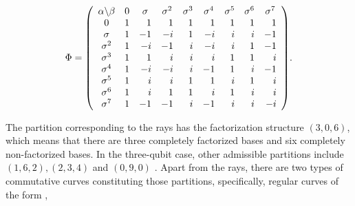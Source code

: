 \documentclass[quantumrep,article,submit,pdftex,moreauthors]{Definitions/mdpi}
\begin{document}
\begin{equation}
  \Phi
  =\left( 
  \begin{array}{ccccccccc}
    \alpha \backslash \beta & 0 & \sigma & \sigma ^{2} & \sigma ^{3} & \sigma
    ^{4} & \sigma ^{5} & \sigma ^{6} & \sigma ^{7} \\ 
    0 & \multicolumn{1}{r}{1} & \multicolumn{1}{r}{1} & \multicolumn{1}{r}{1} & 
    \multicolumn{1}{r}{1} & \multicolumn{1}{r}{1} & \multicolumn{1}{r}{1} & 
    \multicolumn{1}{r}{1} & \multicolumn{1}{r}{1} \\ 
    \sigma & \multicolumn{1}{r}{1} & \multicolumn{1}{r}{-1} & \multicolumn{1}{r}{
    -i} & \multicolumn{1}{r}{1} & \multicolumn{1}{r}{-i} & \multicolumn{1}{r}{i}
    & \multicolumn{1}{r}{i} & \multicolumn{1}{r}{-1} \\ 
    \sigma ^{2} & \multicolumn{1}{r}{1} & \multicolumn{1}{r}{-i} & 
    \multicolumn{1}{r}{-1} & \multicolumn{1}{r}{i} & \multicolumn{1}{r}{-i} & 
    \multicolumn{1}{r}{i} & \multicolumn{1}{r}{1} & \multicolumn{1}{r}{-1} \\ 
    \sigma ^{3} & \multicolumn{1}{r}{1} & \multicolumn{1}{r}{1} & 
    \multicolumn{1}{r}{i} & \multicolumn{1}{r}{i} & \multicolumn{1}{r}{i} & 
    \multicolumn{1}{r}{1} & \multicolumn{1}{r}{1} & \multicolumn{1}{r}{i} \\ 
    \sigma ^{4} & \multicolumn{1}{r}{1} & \multicolumn{1}{r}{-i} & 
    \multicolumn{1}{r}{-i} & \multicolumn{1}{r}{i} & \multicolumn{1}{r}{-1} & 
    \multicolumn{1}{r}{1} & \multicolumn{1}{r}{i} & \multicolumn{1}{r}{-1} \\ 
    \sigma ^{5} & \multicolumn{1}{r}{1} & \multicolumn{1}{r}{i} & 
    \multicolumn{1}{r}{i} & \multicolumn{1}{r}{1} & \multicolumn{1}{r}{1} & 
    \multicolumn{1}{r}{i} & \multicolumn{1}{r}{1} & \multicolumn{1}{r}{i} \\ 
    \sigma ^{6} & \multicolumn{1}{r}{1} & \multicolumn{1}{r}{i} & 
    \multicolumn{1}{r}{1} & \multicolumn{1}{r}{1} & \multicolumn{1}{r}{i} & 
    \multicolumn{1}{r}{1} & \multicolumn{1}{r}{i} & \multicolumn{1}{r}{i} \\ 
    \sigma ^{7} & \multicolumn{1}{r}{1} & \multicolumn{1}{r}{-1} & 
    \multicolumn{1}{r}{-1} & \multicolumn{1}{r}{i} & \multicolumn{1}{r}{-1} & 
    \multicolumn{1}{r}{i} & \multicolumn{1}{r}{i} & \multicolumn{1}{r}{-i}
  \end{array}
  \right).
  \label{ray dps}
\end{equation}

The partition corresponding to the rays has the factorization structure
$(3,0,6)$, which means that there are three completely factorized bases and six
completely non-factorized bases. In the three-qubit case, other admissible
partitions include $(1,6,2),(2,3,4)$ and $(0,9,0)$ \cite{factor1,factor2}. Apart
from the rays, there are two types of commutative curves constituting those
partitions, specifically, regular curves of the form \cite{GS2}, 
\end{document}
